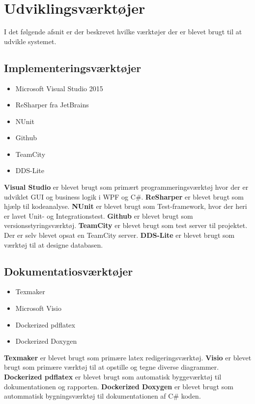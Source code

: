 \section{Udviklingsværktøjer}
\label{developmentstool}
I det følgende afsnit er der beskrevet hvilke værktøjer der er blevet brugt til at udvikle systemet. 

\subsection*{Implementeringsværktøjer}
\begin{itemize}
	\item Microsoft Visual Studio 2015
	\item ReSharper fra JetBrains
	\item NUnit 
	\item Github
	\item TeamCity
	\item DDS-Lite	
\end{itemize}
\textbf{Visual Studio} er blevet brugt som primært programmeringsværktøj hvor der er udviklet GUI og business logik i WPF og C\#. \textbf{ReSharper} er blevet brugt som hjælp til kodeanalyse. \textbf{NUnit} er blevet brugt som Test-framework, hvor der heri er lavet Unit- og Integrationstest. \textbf{Github} er blevet brugt som  versionsstyringsværktøj. \textbf{TeamCity} er blevet brugt som test server til projektet. Der er selv blevet opsat en TeamCity server. \textbf{DDS-Lite} er blevet brugt som værktøj til at designe databasen. 

\subsection*{Dokumentatiosværktøjer}
\begin{itemize}
	\item Texmaker
	\item Microsoft Visio
	\item Dockerized pdflatex
	\item Dockerized Doxygen
\end{itemize}
\textbf{Texmaker} er blevet brugt som primære latex redigeringsværktøj. \textbf{Visio} er blevet brugt som primære værktøj til at opstille og tegne diverse diagrammer. \textbf{Dockerized pdflatex} er blevet brugt som automatisk byggeværktøj til dokumentationen og rapporten. \textbf{Dockerized Doxygen} er blevet brugt som autommatisk bygningsværktøj til dokumentationen af C\# koden. 